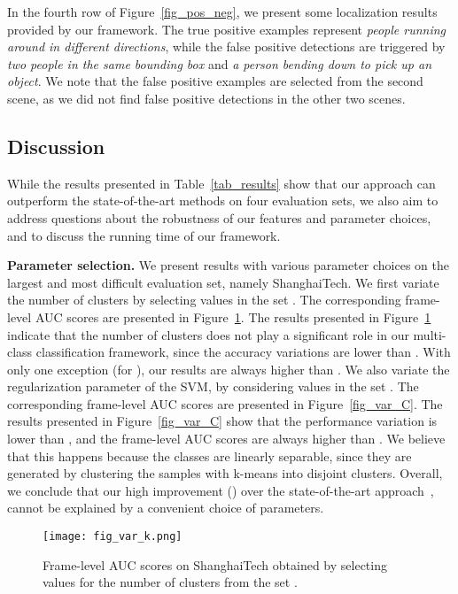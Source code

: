 \documentclass[10pt,twocolumn,letterpaper]{article}
\begin{document}
In the fourth row of Figure~\ref{fig_pos_neg}, we present some localization results provided by our framework. The true positive examples represent \emph{people running around in different directions}, while the false positive detections are triggered by \emph{two people in the same bounding box} and \emph{a person bending down to pick up an object}. We note that the false positive examples are selected from the second scene, as we did not find false positive detections in the other two scenes. 

\vspace*{-0.1cm}
\subsection{Discussion}
\vspace*{-0.1cm}

While the results presented in Table~\ref{tab_results} show that our approach can outperform the state-of-the-art methods on four evaluation sets, we also aim to address questions about the robustness of our features and parameter choices, and to discuss the running time of our framework.

\noindent
{\bf Parameter selection.}
We present results with various parameter choices on the largest and most difficult evaluation set, namely ShanghaiTech. We first variate the number of clusters  by selecting values in the set . The corresponding frame-level AUC scores are presented in Figure~\ref{fig_var_k}. The results presented in Figure~\ref{fig_var_k} indicate that the number of clusters does not play a significant role in our multi-class classification framework, since the accuracy variations are lower than . With only one exception (for ), our results are always higher than . We also variate the regularization parameter of the SVM, by considering values in the set . The corresponding frame-level AUC scores are presented in Figure~\ref{fig_var_C}. The results presented in Figure~\ref{fig_var_C} show that the performance variation is lower than , and the frame-level AUC scores are always higher than . We believe that this happens because the classes are linearly separable, since they are generated by clustering the samples with k-means into disjoint clusters. Overall, we conclude that our high improvement () over the state-of-the-art approach~\cite{Liu-CVPR-2018}, cannot be explained by a convenient choice of parameters.

\begin{figure}[!t]
\begin{center}
\texttt{[image: fig\_var\_k.png]}
\end{center}
\vspace*{-0.4cm}
\caption{Frame-level AUC scores on ShanghaiTech obtained by selecting values for the number of clusters  from the set .}
\label{fig_var_k}
\vspace*{-0.3cm}
\end{figure}
\end{document}
